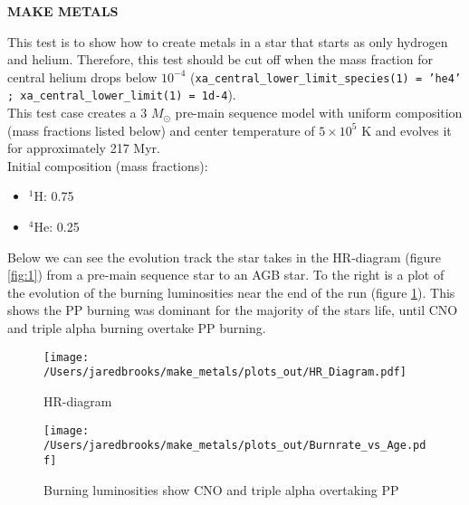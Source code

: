\documentclass{article}
\begin{document}
	
	\begin{center}
		\begin{Large}
		       \textbf{MAKE METALS}\\
		\end{Large}
	\end{center}

        This test is to show how to create metals in a star that starts as only hydrogen and helium.  Therefore, this test should be cut off when the mass fraction for central helium drops below $10^{-4}$ (\texttt{xa\_central\_lower\_limit\_species(1) = 'he4' ; xa\_central\_lower\_limit(1) = 1d-4}).\\

        This test case creates a 3 $M_\odot$ pre-main sequence model with uniform composition (mass fractions listed below) and center temperature of $5\times10^5$ K and evolves it for approximately 217 Myr.\\

        \noindent Initial composition (mass fractions):
        \begin{itemize}
                \item $^1$H: 0.75
                \item $^4$He: 0.25
        \end{itemize}

        Below we can see the evolution track the star takes in the HR-diagram (figure \ref{fig:1}) from a pre-main sequence star to an AGB star.  To the right is a plot of the evolution of the burning luminosities near the end of the run (figure \ref{fig:2}).  This shows the PP burning was dominant for the majority of the stars life, until CNO and triple alpha burning overtake PP burning.

        \begin{figure}[H]
                \begin{minipage}[b]{0.5\linewidth}
		       \centering
		       \texttt{[image: /Users/jaredbrooks/make\_metals/plots\_out/HR\_Diagram.pdf]}
		       \caption{HR-diagram}
		       \label{fig:1}
                \end{minipage}
                \hspace{0cm}
                \begin{minipage}[b]{0.5\linewidth}
                       \centering
                       \texttt{[image: /Users/jaredbrooks/make\_metals/plots\_out/Burnrate\_vs\_Age.pdf]}
                       \caption{Burning luminosities show CNO and triple alpha overtaking PP}
                       \label{fig:2}
                \end{minipage}
	\end{figure}
\end{document}
